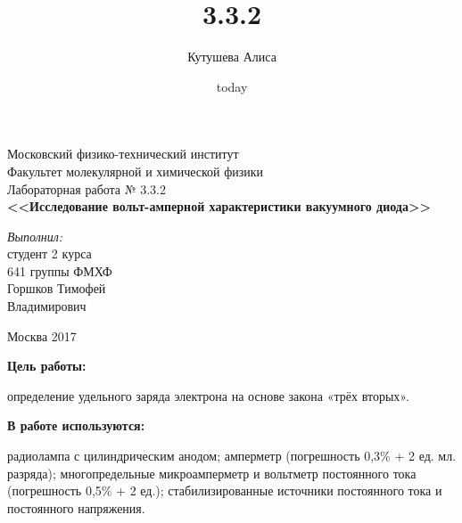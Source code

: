 \documentclass[a4paper,12pt]{article}
\title{3.3.2}
\author{Кутушева Алиса}
\date{today}
\begin{document}
	
	\begin{titlepage}
		\begin{center} 
			
			\large Московский физико-технический институт\\
			Факультет молекулярной и химической физики\\
			\vspace{7cm}
			\huge Лабораторная работа № 3.3.2\\
			\textbf{\Large <<Исследование вольт-амперной характеристики вакуумного диода>>}\\
		\end{center} 
		
		\vspace{7.5cm}
		{\par \raggedleft \large \emph{Выполнил:}\\ студент 2 курса\\ 641 группы ФМХФ\\ Горшков Тимофей \\ Владимирович \par}
		\begin{center}
			\vfill Москва 2017
		\end{center}
	\end{titlepage}
\newpage
\setcounter{page}{2}

\begin{center}
\end{center}

	\hspace{0.2cm}\textbf{Цель работы:}
	\par определение удельного заряда электрона на основе закона «трёх вторых».


	\hspace{0.2cm}\textbf{В работе используются:}
	\par радиолампа с цилиндрическим анодом; амперметр (погрешность 0,3\% + 2 ед. мл. разряда); многопредельные микроамперметр и вольтметр постоянного тока (погрешность 0,5\% + 2 ед.); стабилизированные источники постоянного тока и постоянного напряжения.
	
\end{document}
